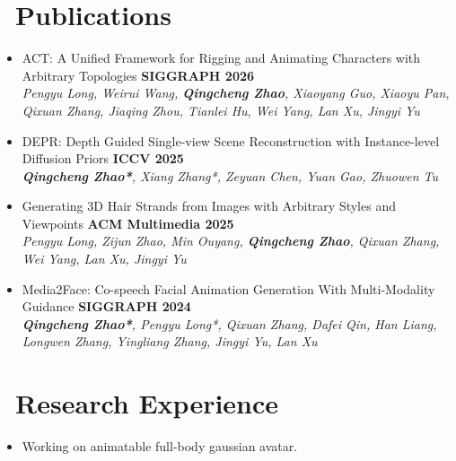 \documentclass{resume}
\begin{document}
\section{\faBook\ Publications}

\begin{itemize}
  \item {\small ACT: A Unified Framework for Rigging and Animating Characters with Arbitrary Topologies} \hfill{\textbf{SIGGRAPH 2026}}\\
    \textit{\small Pengyu Long, Weirui Wang, \textbf{Qingcheng Zhao}, Xiaoyang Guo, Xiaoyu Pan, Qixuan Zhang, Jiaqing Zhou, Tianlei Hu, Wei Yang, Lan Xu, Jingyi Yu}
  \item {\small DEPR: Depth Guided Single-view Scene Reconstruction with Instance-level Diffusion Priors} \hfill{\textbf{ICCV 2025}}\\
        \textit{\small \textbf{Qingcheng Zhao*}, Xiang Zhang*, Zeyuan Chen, Yuan Gao, Zhuowen Tu}

  \item {\small Generating 3D Hair Strands from Images with Arbitrary Styles and Viewpoints} \hfill{\textbf{ACM Multimedia 2025}}\\
    \textit{\small Pengyu Long, Zijun Zhao, Min Ouyang, \textbf{Qingcheng Zhao}, Qixuan Zhang, Wei Yang, Lan Xu, Jingyi Yu}

  \item {\small Media2Face: Co-speech Facial Animation Generation With Multi-Modality Guidance} \hfill{\textbf{SIGGRAPH 2024}}\\
        \textit{\footnotesize \textbf{Qingcheng Zhao*}, Pengyu Long*, Qixuan Zhang, Dafei Qin, Han Liang, Longwen Zhang, Yingliang Zhang, Jingyi Yu, Lan Xu}%
\end{itemize}


\section{\faFlask\ Research Experience}



\begin{itemize}
  \item Working on animatable full-body gaussian avatar.
\end{itemize}
\end{document}
